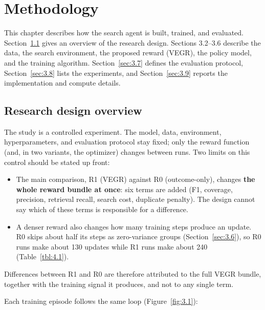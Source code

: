 \chapter{Methodology}\label{sec:3}

This chapter describes how the search agent is built, trained, and
evaluated. Section~\ref{sec:3.1} gives an overview of the research
design. Sections 3.2--3.6 describe the data, the search environment, the
proposed reward (VEGR), the policy model, and the training algorithm.
Section~\ref{sec:3.7} defines the evaluation protocol,
Section~\ref{sec:3.8} lists the experiments, and Section~\ref{sec:3.9}
reports the implementation and compute details.

\section{Research design overview}\label{sec:3.1}

The study is a controlled experiment. The model, data, environment,
hyperparameters, and evaluation protocol stay fixed; only the reward
function (and, in two variants, the optimizer) changes between runs. Two
limits on this control should be stated up front:

\begin{itemize}
\tightlist
\item
  The main comparison, R1 (VEGR) against R0 (outcome-only), changes
  \textbf{the whole reward bundle at once}: six terms are added (F1,
  coverage, precision, retrieval recall, search cost, duplicate
  penalty). The design cannot say which of these terms is responsible
  for a difference.
\item
  A denser reward also changes how many training steps produce an
  update. R0 skips about half its steps as zero-variance groups
  (Section~\ref{sec:3.6}), so R0 runs make about 130 updates while R1
  runs make about 240 (Table~\ref{tbl:4.1}).
\end{itemize}

Differences between R1 and R0 are therefore attributed to the full VEGR
bundle, together with the training signal it produces, and not to any
single term.

Each training episode follows the same loop (Figure~\ref{fig:3.1}):

